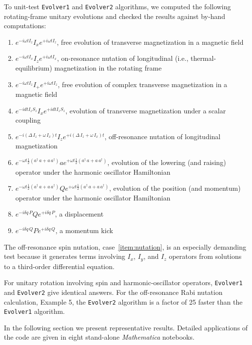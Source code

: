 To unit-test \verb+Evolver1+ and \verb+Evolver2+ algorithms, we computed the following rotating-frame unitary evolutions and checked the results against by-hand computations:
\begin{enumerate}
\item $e^{-i\omega t I_z } I_x e^{+i \omega t I_z}$,  
free evolution of transverse magnetization in a magnetic field
\item $e^{-i \omega t I_x} I_z e^{+i \omega t I_x}$,
on-resonance nutation of longitudinal (i.e., thermal-equilibrium) magnetization in the rotating frame
\item $e^{-i \omega t I_z} I_{+} e^{+i \omega t I_z}$,
free evolution of complex transverse magnetization in a magnetic field 
\item $e^{-i d t I_z S_z} I_x e^{+i d t I_z S_z}$,
evolution of transverse magnetization under a scalar coupling
\item $e^{-i (\Delta \, I_z + \omega \, I_x) t} I_z e^{+i (\Delta \, I_z + \omega \, I_x) t}$, off-resonance nutation of longitudinal magnetization \label{item:nutation}
\item $e^{- \omega t \frac{1}{2} (a^{\dagger} \, a + a \, a^{\dagger})} a e^{+ \omega t \frac{1}{2} (a^{\dagger} \, a + a \, a^{\dagger})}$,
evolution of the lowering (and raising) operator under the harmonic oscillator Hamiltonian
\item $e^{- \omega t \frac{1}{2} (a^{\dagger} \, a + a \, a^{\dagger})} Q e^{+ \omega t \frac{1}{2} (a^{\dagger} \, a + a \, a^{\dagger})}$,
evolution of the position (and momentum) operator under the harmonic oscillator Hamiltonian
\item $e^{-i \delta q \, P }  Q e^{+i \delta q \, P }$, a displacement
\item $e^{-i \delta q \, Q }  P e^{+i \delta q \, Q }$, a momentum kick
\end{enumerate}
The off-resonance spin nutation, case~\ref{item:nutation},  is an especially demanding test because it generates terms involving $I_x$, $I_y$, and $I_z$ operators from solutions to a third-order differential equation.

For unitary rotation involving spin and harmonic-oscillator operators, \verb+Evolver1+ and \verb+Evolver2+ give identical answers.
For the off-resonance Rabi nutation calculation, Example 5, the \verb+Evolver2+ algorithm is a factor of 25 faster than the \verb+Evolver1+ algorithm.

In the following section we present representative results.
Detailed applications of the code are given in eight stand-alone \emph{Mathematica} notebooks.
